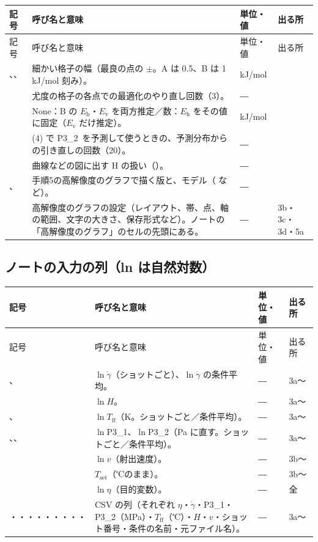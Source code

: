 \documentclass[paper=a4paper,fontsize=10.5pt,line_length=44zw,number_of_lines=38]{jlreq}
\makeatletter
\newcommand{\file}[1]{\texttt{\detokenize{#1}}}
\newcommand{\gd}{\dot{\gamma}}
\newcommand{\Tff}{T_{\mathrm{ff}}}
\newcommand{\Tset}{T_{\mathrm{set}}}
\newcommand{\Eh}{E_{\mathrm{h}}}
\newcommand{\Ev}{E_{\mathrm{v}}}
\newcommand{\PI}{P3\_1}
\newcommand{\PII}{P3\_2}
\newenvironment{symtab}{%
  \begin{longtable}{@{}>{\raggedright\arraybackslash}p{6.5\zw}>{\raggedright\arraybackslash}p{22\zw}>{\raggedright\arraybackslash}p{6\zw}>{\raggedright\arraybackslash}p{4.5\zw}@{}}
  \toprule 記号 & 呼び名と意味 & 単位・値 & 出る所 \\ \midrule \endfirsthead
  \toprule 記号 & 呼び名と意味 & 単位・値 & 出る所 \\ \midrule \endhead
  \bottomrule \endlastfoot}{\end{longtable}}
\makeatother
\begin{document}
\begin{symtab}
\file{FINE_A}、\file{FINE_B}、\file{FINE_B_CV} & 細かい格子の幅（最良の点の $\pm$。A は 0.5、B は 1 kJ/mol 刻み）。 & kJ/mol & 5 \\
\file{N_RESTARTS_PROFILE} & 尤度の格子の各点での最適化のやり直し回数（3）。 & ― & 5 \\
\file{B_EH_FIX} & None：B の $\Eh$・$\Ev$ を両方推定／数：$\Eh$ をその値に固定（$\Ev$ だけ推定）。 & kJ/mol & 5 \\
\file{P32_DRAWS} & (4) で \PII\ を予測して使うときの、予測分布からの引き直しの回数（20）。 & ― & 5 \\
\file{FIG_VARIANTS} & 曲線などの図に出す H の扱い（\file{["1", "2", "4"]}）。 & ― & 5 \\
\file{HR_VERSION}、\file{HR_MODELS} & 手順5の高解像度のグラフで描く版と、モデル（\file{"B_1"} など）。 & ― & 5 \\
\file{HR_...} & 高解像度のグラフの設定（レイアウト、帯、点、軸の範囲、文字の大きさ、保存形式など）。ノートの「高解像度のグラフ」のセルの先頭にある。 & ― & 3b・3c・3d・5a \\
\end{symtab}

\subsection{ノートの入力の列（ln は自然対数）}
\begin{symtab}
\file{ln_gd}、\file{ln_gd_cm} & $\ln\gd$（ショットごと）、$\ln\gd$ の条件平均。 & ― & 3a〜 \\
\file{ln_H} & $\ln H$。 & ― & 3a〜 \\
\file{ln_Tff}、\file{ln_Tff_cm} & $\ln\Tff$（K。ショットごと／条件平均）。 & ― & 3a〜 \\
\file{ln_P31}、\file{ln_P32}、\file{ln_P32_cm} & $\ln$\PI、$\ln$\PII（Pa に直す。ショットごと／条件平均）。 & ― & 3a〜 \\
\file{ln_v} & $\ln v$（射出速度）。 & ― & 3b〜 \\
\file{Tset} & $\Tset$（℃のまま）。 & ― & 3b〜 \\
\file{ln_eta} & $\ln\eta$（目的変数）。 & ― & 全 \\
\file{eta}・\file{gd}・\file{P31}・\file{P32}・\file{Tff}・\file{H}・\file{v}・\file{shot}・\file{cond}・\file{file} & CSV の列（それぞれ $\eta$・$\gd$・\PI・\PII（MPa）・$\Tff$（℃）・$H$・$v$・ショット番号・条件の名前・元ファイル名）。 & ― & 3a〜 \\
\end{symtab}
\end{document}
